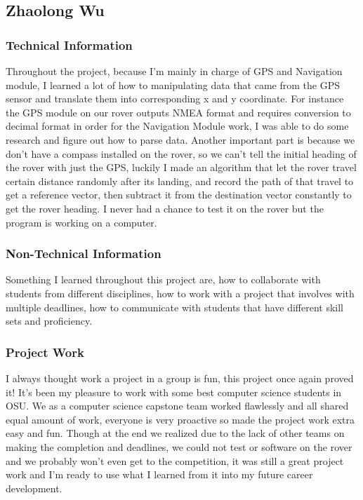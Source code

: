 \documentclass[10pt,letterpaper,onecolumn,draftclsnofoot,journal]{IEEEtran}
\begin{document}
\subsection{\textbf{Zhaolong Wu}}
\subsubsection{\textbf{Technical Information}}
Throughout the project, because I'm mainly in charge of GPS and Navigation module, I learned a lot of how to manipulating data that came from the GPS sensor and translate them into corresponding x and y coordinate. For instance the GPS module on our rover outputs NMEA format and requires conversion to decimal format in order for the Navigation Module work, I was able to do some research and figure out how to parse data. Another important part is because we don't have a compass installed on the rover, so we can't tell the initial heading of the rover with just the GPS, luckily I made an algorithm that let the rover travel certain distance randomly after its landing, and record the path of that travel to get a reference vector, then subtract it from the destination vector constantly to get the rover heading. I never had a chance to test it on the rover but the program is working on a computer.     
\vspace{.3cm}

\subsubsection{\textbf{Non-Technical Information}}
Something I learned throughout this project are, how to collaborate with students from different disciplines, how to work with a project that involves with multiple deadlines, how to communicate with students that have different skill sets and proficiency.
\vspace{.3cm}

\subsubsection{\textbf{Project Work}}
I always thought work a project in a group is fun, this project once again proved it! It's been my pleasure to work with some best computer science students in OSU. We as a computer science capstone team worked flawlessly and all shared equal amount of work, everyone is very proactive so made the project work extra easy and fun. Though at the end we realized due to the lack of other teams on making the completion and deadlines, we could not test or software on the rover and we probably won't even get to the competition, it was still a great project work and I'm ready to use what I learned from it into my future career development.
\vspace{.3cm}
\end{document}
